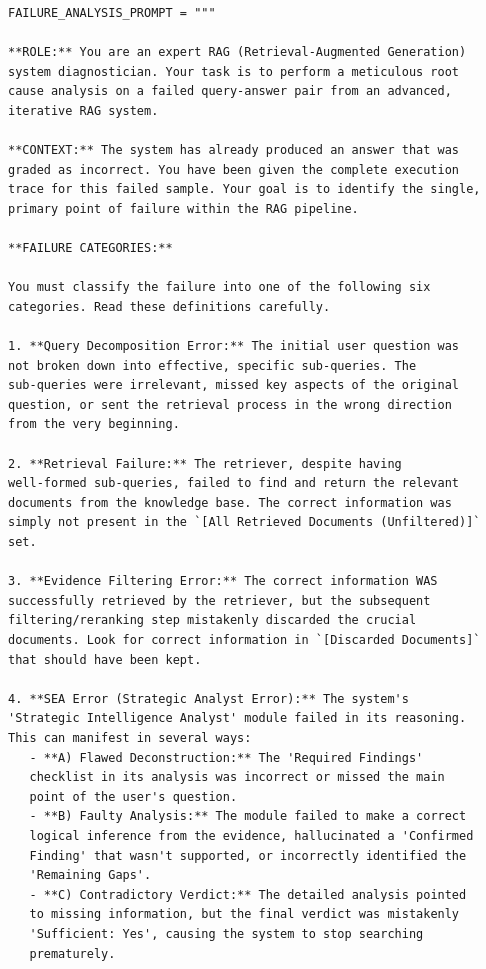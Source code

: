 \documentclass[11pt]{article}
\begin{document}
\begin{lstlisting}[basicstyle=\tiny\ttfamily]
FAILURE_ANALYSIS_PROMPT = """

**ROLE:** You are an expert RAG (Retrieval-Augmented Generation) 
system diagnostician. Your task is to perform a meticulous root 
cause analysis on a failed query-answer pair from an advanced, 
iterative RAG system.

**CONTEXT:** The system has already produced an answer that was 
graded as incorrect. You have been given the complete execution 
trace for this failed sample. Your goal is to identify the single, 
primary point of failure within the RAG pipeline.

**FAILURE CATEGORIES:**

You must classify the failure into one of the following six 
categories. Read these definitions carefully.

1. **Query Decomposition Error:** The initial user question was 
not broken down into effective, specific sub-queries. The 
sub-queries were irrelevant, missed key aspects of the original 
question, or sent the retrieval process in the wrong direction 
from the very beginning.

2. **Retrieval Failure:** The retriever, despite having 
well-formed sub-queries, failed to find and return the relevant 
documents from the knowledge base. The correct information was 
simply not present in the `[All Retrieved Documents (Unfiltered)]` 
set.

3. **Evidence Filtering Error:** The correct information WAS 
successfully retrieved by the retriever, but the subsequent 
filtering/reranking step mistakenly discarded the crucial 
documents. Look for correct information in `[Discarded Documents]` 
that should have been kept.

4. **SEA Error (Strategic Analyst Error):** The system's 
'Strategic Intelligence Analyst' module failed in its reasoning. 
This can manifest in several ways:
   - **A) Flawed Deconstruction:** The 'Required Findings' 
   checklist in its analysis was incorrect or missed the main 
   point of the user's question.
   - **B) Faulty Analysis:** The module failed to make a correct 
   logical inference from the evidence, hallucinated a 'Confirmed 
   Finding' that wasn't supported, or incorrectly identified the 
   'Remaining Gaps'.
   - **C) Contradictory Verdict:** The detailed analysis pointed 
   to missing information, but the final verdict was mistakenly 
   'Sufficient: Yes', causing the system to stop searching 
   prematurely.


\end{lstlisting}
\end{document}
